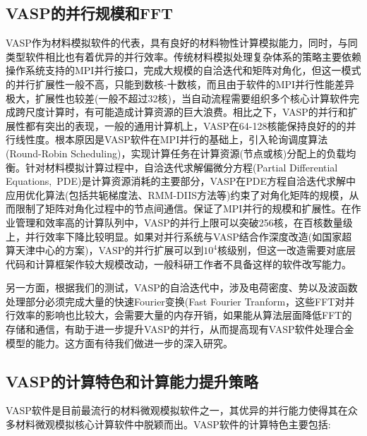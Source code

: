 \subsection{\rm{VASP}的并行规模和\rm{FFT}}
\textrm{VASP}作为材料模拟软件的代表，具有良好的材料物性计算模拟能力，同时，与同类型软件相比也有着优异的并行效率。传统材料模拟处理复杂体系的策略主要依赖操作系统支持的\textrm{MPI}并行接口，完成大规模的自洽迭代和矩阵对角化，但这一模式的并行扩展性一般不高，只能到数核-十数核，而且由于软件的\textrm{MPI}并行性能差异极大，扩展性也较差(一般不超过32核)，当自动流程需要组织多个核心计算软件完成跨尺度计算时，有可能造成计算资源的巨大浪费。相比之下，\textrm{VASP}的并行和扩展性都有突出的表现，一般的通用计算机上，\textrm{VASP}在64-128核能保持良好的的并行线性度。根本原因是\textrm{VASP}软件在\textrm{MPI}并行的基础上，引入轮询调度算法\textrm{(Round-Robin Scheduling)}，实现计算任务在计算资源(节点或核)分配上的负载均衡。针对材料模拟计算过程中，自洽迭代求解偏微分方程\textrm{(Partial Differential Equations,~PDE)}是计算资源消耗的主要部分，\textrm{VASP}在\textrm{PDE}方程自洽迭代求解中应用优化算法(包括共轭梯度法、\textrm{RMM-DIIS}方法等)约束了对角化矩阵的规模，从而限制了矩阵对角化过程中的节点间通信。保证了\textrm{MPI}并行的规模和扩展性。在作业管理和效率高的计算队列中，\textrm{VASP}的并行上限可以突破256核，在百核数量级上，并行效率下降比较明显。如果对并行系统与\textrm{VASP}结合作深度改造(如国家超算天津中心的方案)，\textrm{VASP}的并行扩展可以到$10^4$核级别，但这一改造需要对底层代码和计算框架作较大规模改动，一般科研工作者不具备这样的软件改写能力。

另一方面，根据我们的测试，\textrm{VASP}的自洽迭代中，涉及电荷密度、势以及波函数处理部分必须完成大量的快速\textrm{Fourier}变换(\textrm{Fast Fourier Tranform}，这些\textrm{FFT}对并行效率的影响也比较大，会需要大量的内存开销，如果能从算法层面降低\textrm{FFT}的存储和通信，有助于进一步提升\textrm{VASP}的并行，从而提高现有\textrm{VASP}软件处理合金模型的能力。这方面有待我们做进一步的深入研究。

\subsection{\rm{VASP}的计算特色和计算能力提升策略}
\textrm{VASP}软件是目前最流行的材料微观模拟软件之一，其优异的并行能力使得其在众多材料微观模拟核心计算软件中脱颖而出。\textrm{VASP}软件的计算特色主要包括:

